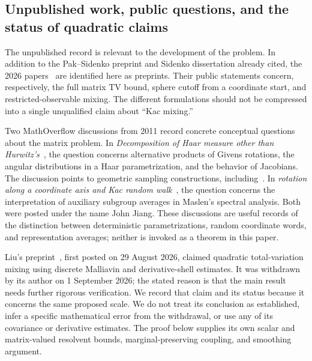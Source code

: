 \documentclass[11pt]{article}
\theoremstyle{definition}\newtheorem{definition}[theorem]{Definition}
\theoremstyle{remark}\newtheorem{remark}[theorem]{Remark}
\begin{document}
\subsection{Unpublished work, public questions, and the status of quadratic claims}
The unpublished record is relevant to the development of the problem. In addition to the Pak--Sidenko preprint and Sidenko dissertation already cited, the 2026 papers~\cite{PS26,JM26,PSV26} are identified here as preprints. Their public statements concern, respectively, the full matrix TV bound, sphere cutoff from a coordinate start, and restricted-observable mixing. The different formulations should not be compressed into a single unqualified claim about ``Kac mixing.''

Two MathOverflow discussions from 2011 record concrete conceptual questions about the matrix problem. In \emph{Decomposition of Haar measure other than Hurwitz's}~\cite{MOHaar}, the question concerns alternative products of Givens rotations, the angular distributions in a Haar parametrization, and the behavior of Jacobians. The discussion points to geometric sampling constructions, including~\cite{Mitchell08}. In \emph{rotation along a coordinate axis and Kac random walk}~\cite{MOKac}, the question concerns the interpretation of auxiliary subgroup averages in Maslen's spectral analysis. Both were posted under the name John Jiang. These discussions are useful records of the distinction between deterministic parametrizations, random coordinate words, and representation averages; neither is invoked as a theorem in this paper.

Liu's preprint~\cite{LiuWithdrawn26}, first posted on 29 August 2026, claimed quadratic total-variation mixing using discrete Malliavin and derivative-shell estimates. It was withdrawn by its author on 1 September 2026; the stated reason is that the main result needs further rigorous verification. We record that claim and its status because it concerns the same proposed scale. We do not treat its conclusion as established, infer a specific mathematical error from the withdrawal, or use any of its covariance or derivative estimates. The proof below supplies its own scalar and matrix-valued resolvent bounds, marginal-preserving coupling, and smoothing argument.
\end{document}
